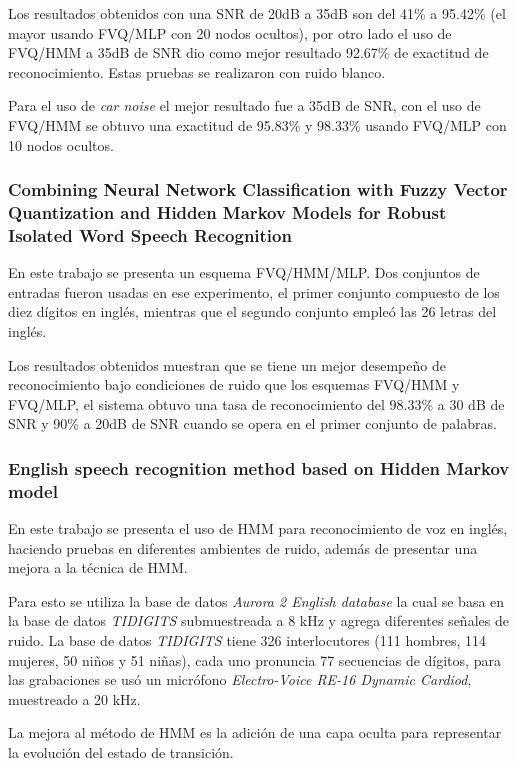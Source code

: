 	Los resultados obtenidos con una SNR de 20dB a 35dB son del 41\% a 95.42\% (el mayor usando FVQ/MLP con 20 nodos ocultos), por otro lado el uso de FVQ/HMM a 35dB de SNR dio como mejor resultado 92.67\% de exactitud de reconocimiento. Estas pruebas se realizaron con ruido blanco.
	
	Para el uso de \textit{car noise} el mejor resultado fue a 35dB de SNR, con el uso de FVQ/HMM se obtuvo una exactitud de 95.83\% y 98.33\% usando FVQ/MLP con  10 nodos ocultos.
	
	\subsubsection*{Combining Neural Network Classification with Fuzzy Vector Quantization and Hidden Markov Models for Robust Isolated Word Speech Recognition \cite{A8}}\label{sub:sota:A8}
	
	En este trabajo se presenta un esquema FVQ/HMM/MLP. Dos conjuntos de entradas fueron usadas en ese experimento, el primer conjunto compuesto de los diez dígitos en inglés, mientras que el segundo conjunto empleó las 26 letras del inglés.
	
	Los resultados obtenidos muestran que se tiene un mejor desempeño de reconocimiento bajo condiciones de ruido que los esquemas FVQ/HMM y FVQ/MLP, el sistema obtuvo una tasa de reconocimiento del 98.33\% a 30 dB de SNR y 90\% a 20dB de SNR cuando se opera en el primer conjunto de palabras.
	
	\subsubsection*{English speech recognition method based on Hidden Markov model \cite{A13}}\label{sub:sota:A13}
	
	En este trabajo se presenta el uso de HMM para reconocimiento de voz en inglés, haciendo pruebas en diferentes ambientes de ruido, además de presentar una mejora a la técnica de HMM.
	
	Para esto se utiliza la base de datos \textit{Aurora 2 English database} la cual se basa en la base de datos \textit{TIDIGITS} submuestreada a 8 kHz y agrega diferentes señales de ruido. La base de datos \textit{TIDIGITS} tiene 326 interlocutores (111 hombres, 114 mujeres, 50 niños y 51 niñas), cada uno pronuncia 77 secuencias de dígitos, para las grabaciones se usó un micrófono \textit{Electro-Voice RE-16 Dynamic Cardiod}, muestreado a 20 kHz.
	
	La mejora al método de HMM es la adición de una capa oculta para representar la evolución del estado de transición.
	
